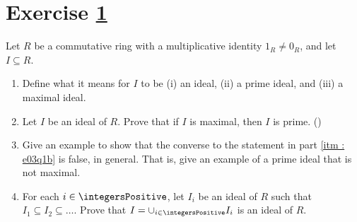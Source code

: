 %
%



\section{Exercise \ref{sec : e03q1}}
\label{sec : e03q1}

\noindent{}Let $R$ be a commutative ring with a multiplicative identity $1_{R} \neq 0_{R}$, and let $I \subseteq R$.
\begin{enumerate}[label=(\alph*)]
\item\label{itm : e03q1a} Define what it means for $I$ to be (i) an ideal, (ii) a prime ideal, and (iii) a maximal ideal.
\item\label{itm : e03q1b} Let $I$ be an ideal of $R$. Prove that if $I$ is maximal, then $I$ is prime. ()
\item\label{itm : e03q1c} Give an example to show that the converse to the statement in part \ref{itm : e03q1b} is false, in general. That is, give an example of a prime ideal that is not maximal.
\item\label{itm : e03q1d} For each $i \in \integersPositive$, let $I_{i}$ be an ideal of $R$ such that $I_{1} \subseteq I_{2} \subseteq \ldots$. Prove that $I = \cup_{i \in \integersPositive} I_{i}$ is an ideal of $R$.
\end{enumerate}

